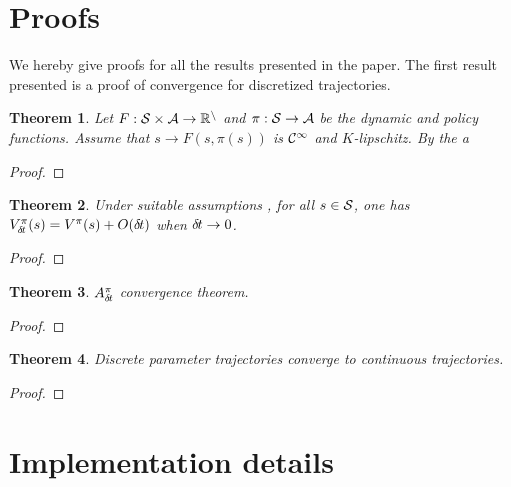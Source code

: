 \documentclass[11pt]{article}
\newtheorem{theorem}{Theorem}
\begin{document}
\section{Proofs}
We hereby give proofs for all the results presented in the paper.
The first result presented is a proof of convergence for discretized
trajectories.
\begin{theorem}
	Let $F: \cal{S} \times \cal{A} \rightarrow \mathbb{R}^n$ and
	$\pi: \cal{S} \rightarrow \cal{A}$ be the dynamic and policy
	functions. Assume that $s \rightarrow F(s, \pi(s))$ is 
	$\cal{C}^1$ and $K$-lipschitz. By the 
	a 

	\label{th:traj-conv}
\end{theorem}
\begin{proof}
	
\end{proof}
\begin{theorem}
	Under suitable assumptions , for all $s \in {\cal
	S}$, one has
	$V^\pi_{\delta\hspace{-.1em}t}(s) = V^\pi(s) + O({\delta\hspace{-.1em}t})$
	when ${\delta\hspace{-.1em}t}\to 0$.
	\label{th:conv-value}
\end{theorem}
\begin{proof}
	
\end{proof}
\begin{theorem}
	$A^\pi_{\delta\hspace{-.1em}t}$ convergence theorem.
\end{theorem}
\begin{proof}
	
\end{proof}
\begin{theorem}
	Discrete parameter trajectories converge to continuous trajectories.
\end{theorem}
\begin{proof}
	
\end{proof}
\section{Implementation details}
\end{document}
